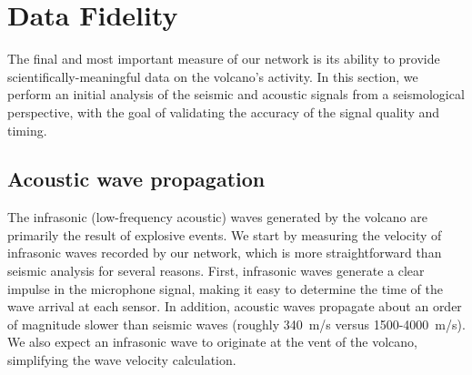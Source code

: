\section{Data Fidelity}
\label{sec-fidelity}

The final and most important measure of our network is its ability to
provide scientifically-meaningful data on the volcano's activity. In
this section, we perform an initial analysis of the seismic and
acoustic signals from a seismological perspective, with the goal of
validating the accuracy of the signal quality and timing.

\subsection{Acoustic wave propagation}

The infrasonic (low-frequency acoustic) waves generated by the
volcano are primarily the result of explosive events. 
We start by measuring the velocity of infrasonic waves recorded by our
network, which is more straightforward than seismic analysis for
several reasons.  First, infrasonic waves generate a clear
impulse in the microphone signal, making it easy to determine the
time of the wave arrival at each sensor. In addition, acoustic waves
propagate about an order of magnitude slower than seismic waves
(roughly 340~m/s versus 1500-4000~m/s).
We also expect an infrasonic wave to originate at the 
vent of the volcano, simplifying the wave velocity calculation.


